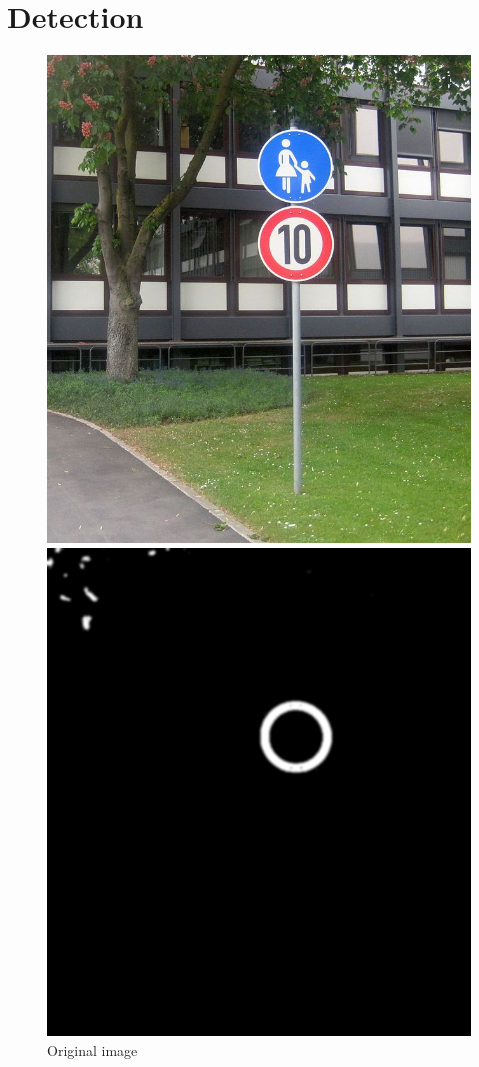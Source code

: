 \section{Detection}
\begin{figure}[H]
	\includegraphics[width=\linewidth]{images/101.jpg}
	\caption{Original image\cite{10kmh}}\label{fig:original_image}
	\endminipage\hfill
	\includegraphics[width=\linewidth]{images/filteredimg.png}

\end{figure}

